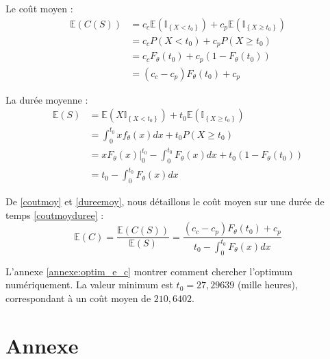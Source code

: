 \documentclass[10pt,a4paper]{article}
\begin{document}
Le coût moyen :
\begin{align}
    \label{coutmoy}
    \mathbb{E}\left( {C\left( S \right)} \right) & = {c_c}\mathbb{E}\left( {{\mathbb{I}_{\left\{ {X < {t_0}} \right\}}}} \right) + {c_p}\mathbb{E}\left( {{\mathbb{I}_{\left\{ {X \geqslant {t_0}} \right\}}}} \right) \nonumber \\
    & = {c_c}P\left( {X < {t_0}} \right) + {c_p}P\left( {X \geqslant {t_0}} \right) \nonumber \\
    & = {c_c}{F_\theta }\left( {{t_0}} \right) + {c_p}\left( {1 - {F_\theta }\left( {{t_0}} \right)} \right) \nonumber \\
    & = \left( {{c_c} - {c_p}} \right){F_\theta }\left( {{t_0}} \right) + {c_p}
\end{align}

La durée moyenne :
\begin{align}
    \label{dureemoy}
    \mathbb{E}\left( S \right) & = \mathbb{E}\left( {X{\mathbb{I}_{\left\{ {X < {t_0}} \right\}}}} \right) + {t_0}\mathbb{E}\left( {{\mathbb{I}_{\left\{ {X \geqslant {t_0}} \right\}}}} \right)\nonumber\\
    & = \int_0^{{t_0}} {x{f_\theta }\left( x \right)dx}  + {t_0}P\left( {X \geqslant {t_0}} \right) \nonumber \\
    & = x{F_\theta }\left( x \right)|_0^{{t_0}} - \int_0^{{t_0}} {{F_\theta }\left( x \right)dx}  + {t_0}\left( {1 - {F_\theta }\left( {{t_0}} \right)} \right) \nonumber \\
    & = {t_0} - \int_0^{{t_0}} {{F_\theta }\left( x \right)dx}
\end{align}

De \eqref{coutmoy} et \eqref{dureemoy}, nous détaillons le coût moyen sur une durée de temps \eqref{coutmoyduree} :
\begin{equation}
    \label{coutmoydureedet}
    \mathbb{E}\left( C \right) = \frac{{\mathbb{E}\left( {C\left( S \right)} \right)}}{{\mathbb{E}\left( S \right)}} = \frac{{\left( {{c_c} - {c_p}} \right){F_\theta }\left( {{t_0}} \right) + {c_p}}}{{{t_0} - \int_0^{{t_0}} {{F_\theta }\left( x \right)dx} }}
\end{equation}

L'annexe \eqref{annexe:optim_e_c} montrer comment chercher l'optimum numériquement. La valeur minimum est $t_0 = 27,29639$ (mille heures), correspondant à un coût moyen de $210,6402$.

\section{Annexe}
\end{document}
